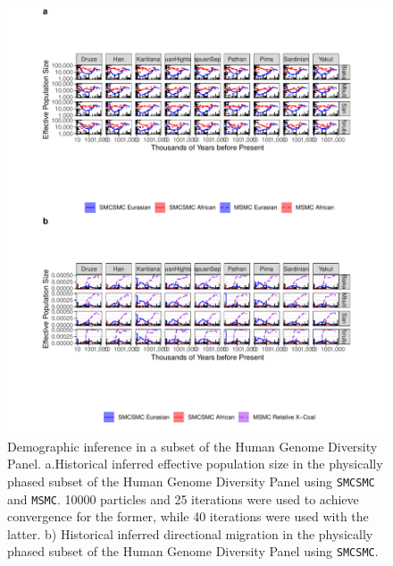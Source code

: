 \documentclass{article}
\begin{document}
\begin{figure}
    \centering
    \includegraphics[width = \textwidth]{plot/hgdp_ne_mig.pdf}
    \caption{Demographic inference in a subset of the Human Genome Diversity Panel. a.Historical inferred effective population size in the physically phased subset of the Human Genome Diversity Panel using {\tt SMCSMC} and {\tt MSMC}. 10000 particles and 25 iterations were used to achieve convergence for the former, while 40 iterations were used with the latter. b) Historical inferred directional migration in the physically phased subset of the Human Genome Diversity Panel using {\tt SMCSMC}.}
    \label{fig:hgdp}
\end{figure}
\end{document}
